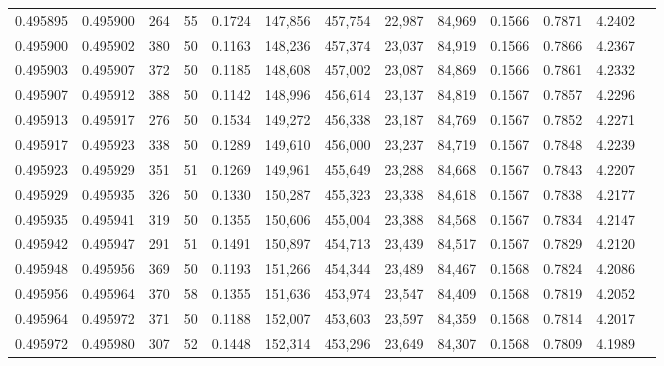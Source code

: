 \begin{tabular}{rrrrrrrrrrrrr}
0.495895 & 0.495900 & 264 &  55 &                                     0.1724 & 147,856 & 457,754 &  22,987 &  84,969 & 0.1566 & 0.7871 & 4.2402 \\
0.495900 & 0.495902 & 380 &  50 &                                     0.1163 & 148,236 & 457,374 &  23,037 &  84,919 & 0.1566 & 0.7866 & 4.2367 \\
0.495903 & 0.495907 & 372 &  50 &                                     0.1185 & 148,608 & 457,002 &  23,087 &  84,869 & 0.1566 & 0.7861 & 4.2332 \\
0.495907 & 0.495912 & 388 &  50 &                                     0.1142 & 148,996 & 456,614 &  23,137 &  84,819 & 0.1567 & 0.7857 & 4.2296 \\
0.495913 & 0.495917 & 276 &  50 &                                     0.1534 & 149,272 & 456,338 &  23,187 &  84,769 & 0.1567 & 0.7852 & 4.2271 \\
0.495917 & 0.495923 & 338 &  50 &                                     0.1289 & 149,610 & 456,000 &  23,237 &  84,719 & 0.1567 & 0.7848 & 4.2239 \\
0.495923 & 0.495929 & 351 &  51 &                                     0.1269 & 149,961 & 455,649 &  23,288 &  84,668 & 0.1567 & 0.7843 & 4.2207 \\
0.495929 & 0.495935 & 326 &  50 &                                     0.1330 & 150,287 & 455,323 &  23,338 &  84,618 & 0.1567 & 0.7838 & 4.2177 \\
0.495935 & 0.495941 & 319 &  50 &                                     0.1355 & 150,606 & 455,004 &  23,388 &  84,568 & 0.1567 & 0.7834 & 4.2147 \\
0.495942 & 0.495947 & 291 &  51 &                                     0.1491 & 150,897 & 454,713 &  23,439 &  84,517 & 0.1567 & 0.7829 & 4.2120 \\
0.495948 & 0.495956 & 369 &  50 &                                     0.1193 & 151,266 & 454,344 &  23,489 &  84,467 & 0.1568 & 0.7824 & 4.2086 \\
0.495956 & 0.495964 & 370 &  58 &                                     0.1355 & 151,636 & 453,974 &  23,547 &  84,409 & 0.1568 & 0.7819 & 4.2052 \\
0.495964 & 0.495972 & 371 &  50 &                                     0.1188 & 152,007 & 453,603 &  23,597 &  84,359 & 0.1568 & 0.7814 & 4.2017 \\
0.495972 & 0.495980 & 307 &  52 &                                     0.1448 & 152,314 & 453,296 &  23,649 &  84,307 & 0.1568 & 0.7809 & 4.1989 \\

\end{tabular}
